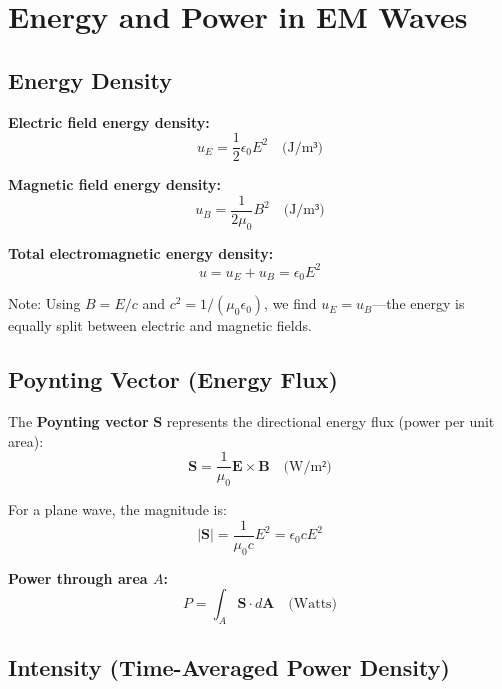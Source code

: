 \section{Energy and Power in EM Waves}

\subsection{Energy Density}

\textbf{Electric field energy density:}
\begin{equation}
u_E = \frac{1}{2}\epsilon_0 E^2 \quad \text{(J/m³)}
\label{eq:energy-E}
\end{equation}

\textbf{Magnetic field energy density:}
\begin{equation}
u_B = \frac{1}{2\mu_0} B^2 \quad \text{(J/m³)}
\label{eq:energy-B}
\end{equation}

\textbf{Total electromagnetic energy density:}
\begin{equation}
u = u_E + u_B = \epsilon_0 E^2
\label{eq:energy-total}
\end{equation}

Note: Using $B = E/c$ and $c^2 = 1/(\mu_0\epsilon_0)$, we find $u_E = u_B$---the energy is equally split between electric and magnetic fields.

\subsection{Poynting Vector (Energy Flux)}

The \textbf{Poynting vector} $\mathbf{S}$ represents the directional energy flux (power per unit area):
\begin{equation}
\mathbf{S} = \frac{1}{\mu_0} \mathbf{E} \times \mathbf{B} \quad \text{(W/m²)}
\label{eq:poynting}
\end{equation}

For a plane wave, the magnitude is:
\begin{equation}
|\mathbf{S}| = \frac{1}{\mu_0 c} E^2 = \epsilon_0 c E^2
\label{eq:poynting-mag}
\end{equation}

\textbf{Power through area $A$:}
\begin{equation}
P = \int_A \mathbf{S} \cdot d\mathbf{A} \quad \text{(Watts)}
\label{eq:power-area}
\end{equation}

\subsection{Intensity (Time-Averaged Power Density)}

